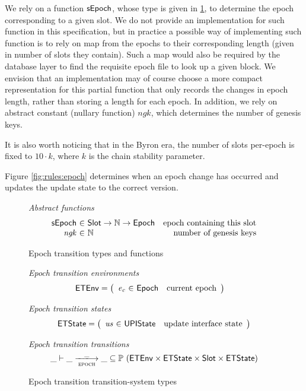 \documentclass[11pt,a4paper]{article}
\newcommand{\powerset}[1]{\mathbb{P}~#1}
\newcommand{\var}[1]{\mathit{#1}}
\newcommand{\fun}[1]{\mathsf{#1}}
\newcommand{\type}[1]{\mathsf{#1}}
\newcommand{\trans}[2]{\xlongrightarrow[\textsc{#1}]{#2}}
\newcommand{\totalf}{\to}
\newcommand{\Slot}{\type{Slot}}
\begin{document}
We rely on a function $\fun{\sepochname}$, whose type is given in
\cref{fig:defs:epoch}, to determine the epoch corresponding to a given slot.
%
We do not provide an implementation for such function in this specification,
but in practice a possible way of implementing such function is to rely on map
from the epochs to their corresponding length (given in number of slots they
contain). Such a map would also be required by the database layer to find the
requisite epoch file to look up a given block. We envision that an
implementation may of course choose a more compact representation for this
partial function that only records the changes in epoch length, rather than
storing a length for each epoch.
%
In addition, we rely on abstract constant (nullary function) $\var{ngk}$, which
determines the number of genesis keys.

It is also worth noticing that in the Byron era, the number of slots per-epoch
is fixed to $10 \cdot k$, where $k$ is the chain stability parameter.

Figure \ref{fig:rules:epoch} determines when an epoch change has occurred and
updates the update state to the correct version.

\begin{figure}[ht]
  \emph{Abstract functions}
  \begin{equation*}
    \begin{array}{r@{~\in~}lr}
      \fun{\sepochname}
      & \Slot \totalf \mathbb{N} \totalf \Epoch
      & \text{epoch containing this slot} \\
      \var{ngk} & \mathbb{N} & \text{number of genesis keys}\\
    \end{array}
  \end{equation*}

  \caption{Epoch transition types and functions}
  \label{fig:defs:epoch}
\end{figure}

\begin{figure}[ht]
  \emph{Epoch transition environments}
  \begin{align*}
    & \ETEnv
      = \left(
          \begin{array}{r@{~\in~}lr}
            \var{e_c} & \Epoch & \text{current epoch}
          \end{array}\right)
  \end{align*}

  \emph{Epoch transition states}
  \begin{equation*}
    \ETState =
    \left(
      \begin{array}{r@{~\in~}lr}
        \var{us} & \UPIState & \text{update interface state}
      \end{array}
    \right)
  \end{equation*}

  \emph{Epoch transition transitions}
  \begin{equation*}
    \_ \vdash \var{\_} \trans{epoch}{\_} \var{\_} \subseteq
    \powerset (\ETEnv \times \ETState \times \Slot \times \ETState)
  \end{equation*}
  \caption{Epoch transition transition-system types}
  \label{fig:ts-types:epoch}
\end{figure}
\end{document}
